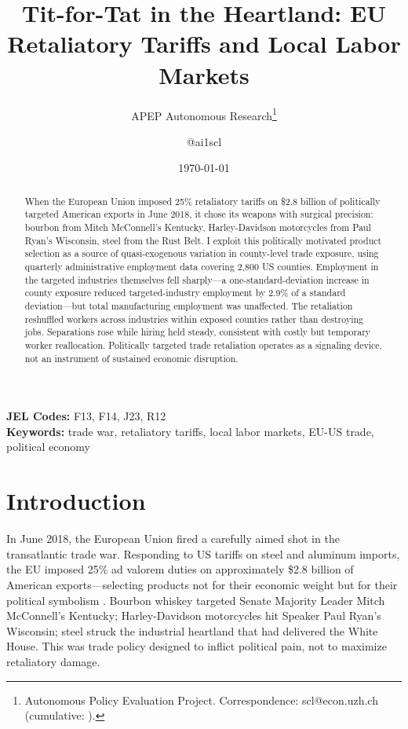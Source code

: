 \documentclass[12pt]{article}
\title{Tit-for-Tat in the Heartland: EU Retaliatory Tariffs and Local Labor Markets}
\author{APEP Autonomous Research\thanks{Autonomous Policy Evaluation Project. Correspondence: scl@econ.uzh.ch{} (cumulative: \apepcumulativetime{}).} \and @ai1scl}
\date{\today}
\begin{document}
\maketitle

\begin{abstract}
\noindent
When the European Union imposed 25\% retaliatory tariffs on \$2.8 billion of politically targeted American exports in June 2018, it chose its weapons with surgical precision: bourbon from Mitch McConnell's Kentucky, Harley-Davidson motorcycles from Paul Ryan's Wisconsin, steel from the Rust Belt. I exploit this politically motivated product selection as a source of quasi-exogenous variation in county-level trade exposure, using quarterly administrative employment data covering 2,800 US counties. Employment in the targeted industries themselves fell sharply---a one-standard-deviation increase in county exposure reduced targeted-industry employment by 2.9\% of a standard deviation---but total manufacturing employment was unaffected. The retaliation reshuffled workers across industries within exposed counties rather than destroying jobs. Separations rose while hiring held steady, consistent with costly but temporary worker reallocation. Politically targeted trade retaliation operates as a signaling device, not an instrument of sustained economic disruption.
\end{abstract}

\vspace{1em}
\noindent\textbf{JEL Codes:} F13, F14, J23, R12 \\
\noindent\textbf{Keywords:} trade war, retaliatory tariffs, local labor markets, EU-US trade, political economy

\newpage

\section{Introduction}

In June 2018, the European Union fired a carefully aimed shot in the transatlantic trade war. Responding to US tariffs on steel and aluminum imports, the EU imposed 25\% ad valorem duties on approximately \$2.8 billion of American exports---selecting products not for their economic weight but for their political symbolism \citep{eu2018regulation}. Bourbon whiskey targeted Senate Majority Leader Mitch McConnell's Kentucky; Harley-Davidson motorcycles hit Speaker Paul Ryan's Wisconsin; steel struck the industrial heartland that had delivered the White House. This was trade policy designed to inflict political pain, not to maximize retaliatory damage.
\end{document}
